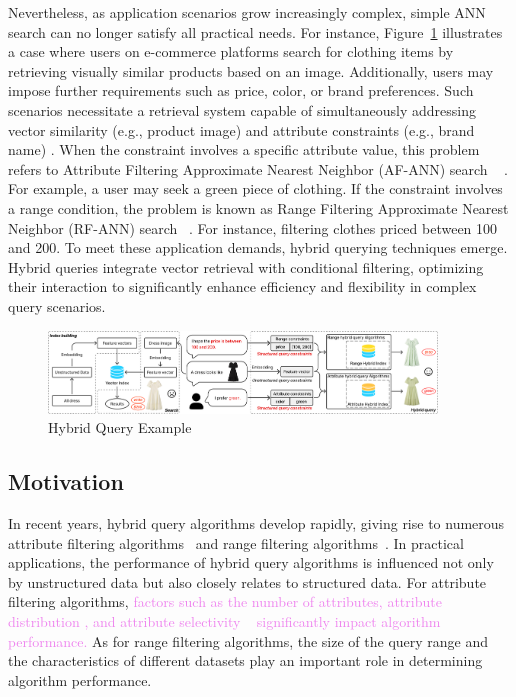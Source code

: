 \documentclass[sigconf, nonacm]{acmart}
\begin{document}
	Nevertheless, as application scenarios grow increasingly complex, simple ANN search can no longer satisfy all practical needs. For instance, Figure~\ref{fig:hybrid ANNS} illustrates a case where users on e-commerce platforms search for clothing items by retrieving visually similar products based on an image. Additionally, users may impose further requirements such as price, color, or brand preferences. Such scenarios necessitate a retrieval system capable of simultaneously addressing vector similarity (e.g., product image) and attribute constraints (e.g., brand name) \cite{tian2023approximate}. When the constraint involves a specific attribute value, this problem refers to Attribute Filtering Approximate Nearest Neighbor (AF-ANN) search ~\cite{NHQ,Filtered-diskann} . For example, a user may seek a green piece of clothing. If the constraint involves a range condition, the problem is known as Range Filtering Approximate Nearest Neighbor (RF-ANN) search ~\cite{serf,iRangeGraph}. For instance, filtering clothes priced between 100 and 200. To meet these application demands, hybrid querying techniques \cite{JD-e-commerce, analyticdb} emerge. Hybrid queries integrate vector retrieval with conditional filtering, optimizing their interaction to significantly enhance efficiency and flexibility in complex query scenarios.
	
	\begin{figure}
		\centering
		\setlength{\belowcaptionskip}{-0.cm}
		\includegraphics[width=0.92\textwidth]{figures/hybrid ANNS.pdf}
		\caption{Hybrid Query Example}
		
		\label{fig:hybrid ANNS}
	\end{figure}
	\subsection{Motivation}
	In recent years, hybrid query algorithms develop rapidly, giving rise to numerous attribute filtering algorithms~\cite{NHQ,diskann} and range filtering algorithms~\cite{serf,iRangeGraph}. In practical applications, the performance of hybrid query algorithms is influenced not only by unstructured data but also closely relates to structured data. For attribute filtering algorithms, \textcolor{violet}{factors such as the number of attributes, attribute distribution \cite{UNG}, and attribute selectivity ~\cite{analyticdb,milvus} significantly impact algorithm performance.} As for range filtering algorithms, the size of the query range and the characteristics of different datasets play an important role in determining algorithm performance.
	
\end{document}
